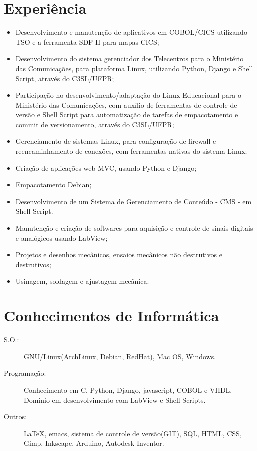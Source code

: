 \documentclass[pdftex, a4paper, 11pt]{article}
\begin{document}
\section*{Experiência}
\begin{itemize}
\item Desenvolvimento e manutenção de aplicativos em COBOL/CICS utilizando TSO e a ferramenta SDF II para mapas CICS;
\item Desenvolvimento do sistema gerenciador dos Telecentros para o Ministério das Comunicações, para plataforma Linux, utilizando Python, Django e Shell Script, através do C3SL/UFPR;
\item Participação no desenvolvimento/adaptação do Linux Educacional para o Ministério das Comunicações, com auxílio de ferramentas de controle de versão e Shell Script para automatização de tarefas de empacotamento e commit de versionamento, através do C3SL/UFPR;
\item Gerenciamento de sistemas Linux, para configuração de firewall e reencaminhamento de conexões, com ferramentas nativas do sistema Linux;
\item Criação de aplicações web MVC, usando Python e Django;
\item Empacotamento Debian;
\item Desenvolvimento de um Sistema de Gerenciamento de Conteúdo - CMS - em Shell Script.
\item Manutenção e criação de softwares para aquisição e controle de sinais digitais e analógicos usando LabView; %
\item Projetos e desenhos mecânicos, ensaios mecânicos não destrutivos e destrutivos;
\item Usinagem, soldagem e ajustagem mecânica.
\end{itemize}

\section*{Conhecimentos de Informática}
\begin{description}
\item[S.O.:] GNU/Linux(ArchLinux, Debian, RedHat), Mac OS, Windows.
\item[Programação:] Conhecimento em C, Python, Django, javascript, COBOL e VHDL. Domínio em desenvolvimento com LabView e Shell Scripts.
\item[Outros:] \LaTeX, emacs, sistema de controle de versão(GIT), SQL, HTML, CSS, Gimp, Inkscape, Arduino, Autodesk Inventor.
\end{description}
\end{document}
